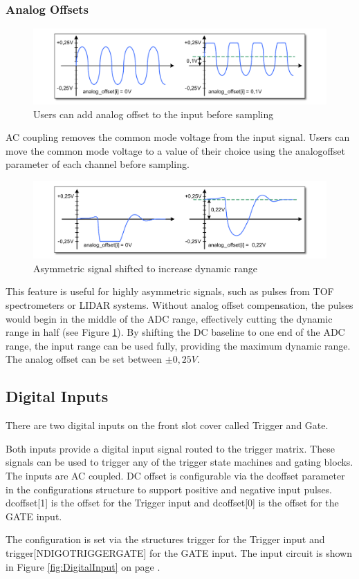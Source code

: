 \subsubsection{Analog Offsets}
%
\begin{figure}[ht]
    \centering
    \includegraphics[width=\textwidth]{figures/AnalogOffset_Sine.pdf}
    \caption{Users can add analog offset to the input before sampling}
\end{figure}
%
AC coupling removes the common mode voltage from the input signal. Users can move the common mode voltage to a value of their choice using the analog\tu offset parameter of each channel before sampling.\par
%
\begin{figure}[!ht]
    \centering
    \includegraphics[width=\textwidth]{figures/AnalogOffset_Pulse.pdf}
    \caption{Asymmetric signal shifted to increase dynamic range\label{fig:shiftInput}}
\end{figure}
%
This feature is useful for highly asymmetric signals, such as pulses from TOF spectrometers or LIDAR systems. Without analog offset compensation, the pulses would begin in the middle of the ADC range, effectively cutting the dynamic range in half (see Figure \ref{fig:shiftInput}). By shifting the DC baseline to one end of the ADC range, the input range can be used fully, providing the maximum dynamic range. The analog offset can be set between $\pm 0,25V$.
%
%
%
\subsection{Digital Inputs}
%
There are two digital inputs on the front slot cover called Trigger and Gate.\par
Both inputs provide a digital input signal routed to the trigger matrix. These signals can be used to trigger any of the trigger state machines and gating blocks. The inputs are AC coupled. DC offset is configurable via the \textsf{dc\tu offset} parameter in the configurations structure to support positive and negative input pulses. \textsf{dc\tu offset[1]} is the offset for the Trigger input and \textsf{dc\tu offset[0]} is the offset for the GATE input.\par
The configuration is set via the structures \textsf{trigger} for the Trigger input and \textsf{trigger[NDIGO\tu TRIGGER\tu GATE]} for the GATE input. The input circuit is shown in Figure \ref{fig:DigitalInput} on page \pageref{fig:DigitalInput}.
%
%
%
